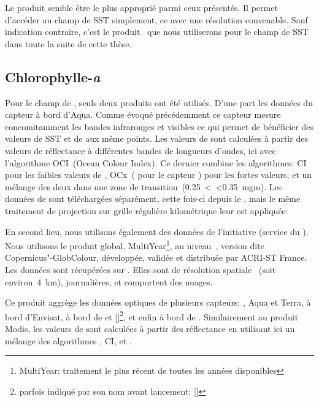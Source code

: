 Le produit  semble être le plus approprié parmi ceux présentés.
Il permet d'accéder au champ de SST simplement, ce avec une résolution convenable.
Sauf indication contraire, c'est le produit~ que nous utiliserons pour le champ de SST dans toute la suite de cette thèse.

\subsection{Chlorophylle-\textit{a}}
\label{sec:donnees-chl}

Pour le champ de , seuls deux produits ont été utilisés.
D'une part les données du capteur  à bord d'Aqua.
Comme évoqué précédemment ce capteur mesure concomitamment les bandes infrarouges et visibles ce qui permet de bénéficier des valeurs de SST et de  aux même points.
Les valeurs de  sont calculées à partir des valeurs de réflectance à différentes bandes de longueurs d'ondes, ici avec l'algorithme OCI~(Ocean Colour Index).
Ce dernier combine les algorithmes: CI pour les faibles valeurs de , OCx~(  pour le capteur ) pour les fortes valeurs, et un mélange des deux dans une zone de transition~(0.25~\textless {}~\textless 0.35~\unit{mgm}).
Les données de  sont téléchargées séparément, cette fois-ci depuis le , mais le même traitement de projection sur grille régulière kilométrique leur est appliquée.

En second lieu, nous utilisons également des données de l'initiative  (service du ).
Nous utilisons le produit global, MultiYear\footnote{%
  MultiYear: traitement le plus récent de toutes les années disponibles
}, au niveau~, version dite Copernicus"-GlobColour, développée, validée et distribuée par ACRI-ST France.
Les données sont récupérées sur .
Elles sont de résolution spatiale~ (soit environ~\qty{4}{\km}), journalières, et comportent des nuages.

Ce produit aggrège les données optiques de plusieurs capteurs: ,  Aqua et Terra,  à bord d'Envisat,  à bord de  et []\footnote{parfois indiqué par son nom avant lancement: []}, et enfin  à bord de .
Similairement au produit Modis, les valeurs de  sont calculées à partir des réflectance en utilisant ici un mélange des algorithmes , CI, et .

